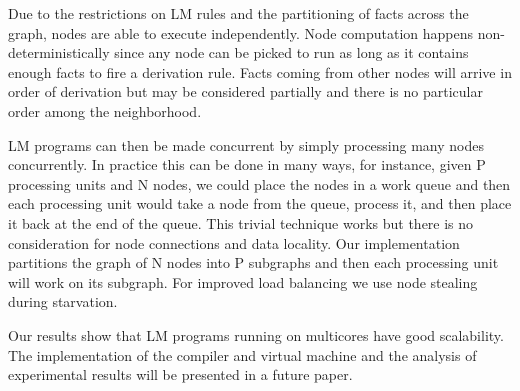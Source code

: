 Due to the restrictions on LM rules and the partitioning of facts across the graph, nodes are able to
execute independently. Node computation happens non-deterministically since any node can be picked to run as long as it
contains enough facts to fire a derivation rule. Facts coming from other nodes will arrive in order of derivation but may be considered
partially and there is no particular order among the neighborhood.

LM programs can then be made concurrent by simply processing many nodes concurrently. In practice this can be done in many ways, for instance,
given P processing units and N nodes, we could place the nodes in a work queue and then each processing unit would take
a node from the queue, process it, and then place it back at the end of the queue. This trivial technique works but there is no consideration
for node connections and data locality. Our implementation partitions the graph of N nodes into P subgraphs and then each
processing unit will work on its subgraph.
For improved load balancing we use node stealing during starvation.

Our results show that LM programs running on multicores have good scalability. The implementation of the compiler and virtual machine and
the analysis of experimental results will be presented in a future paper.
